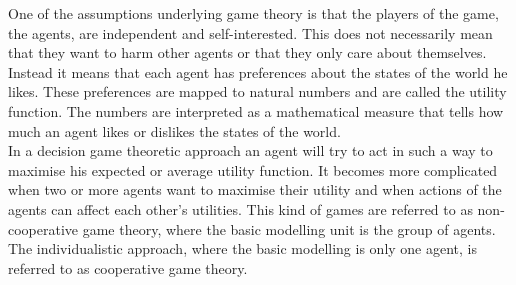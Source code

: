 One of the assumptions underlying game theory is that the players of the game, the agents, are independent and self-interested. This does not necessarily mean that they want to harm other agents or that they only care about themselves. 
Instead it means that each agent has preferences about the states of the world he likes. These preferences are mapped to natural numbers and are called the utility function. The numbers are interpreted as a mathematical measure that tells how much an agent likes or dislikes the states of the world. \\
In a decision game theoretic approach an agent will try to act in such a way to maximise his expected or average utility function. It becomes more complicated when two or more agents want to maximise their utility and when actions of the agents can affect each other's utilities. This kind of games are referred to as non-cooperative game theory, where the basic modelling unit is the group of agents. The individualistic approach, where the basic modelling is only one agent, is referred to as cooperative game theory. 

 


